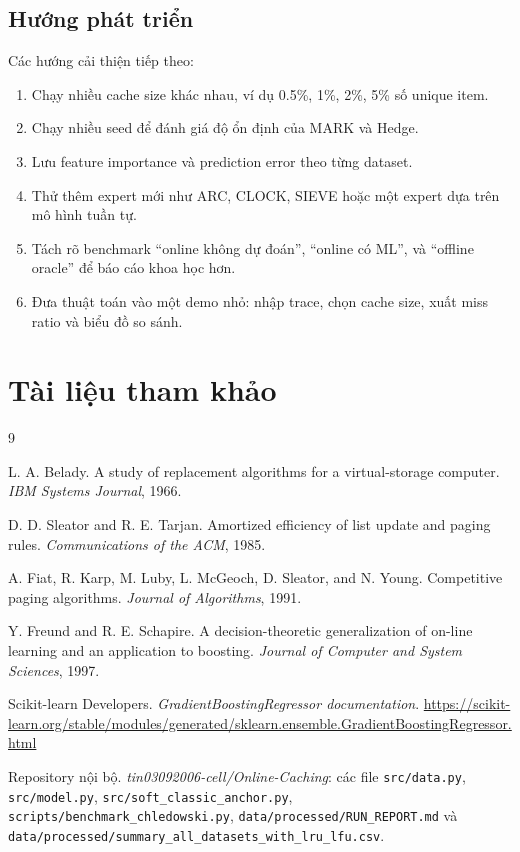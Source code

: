 \documentclass[11pt,a4paper]{article}
\newcommand{\code}[1]{\texttt{#1}}
\begin{document}
\subsection{Hướng phát triển}

Các hướng cải thiện tiếp theo:

\begin{enumerate}[leftmargin=1.4em]
    \item Chạy nhiều cache size khác nhau, ví dụ 0.5\%, 1\%, 2\%, 5\% số unique item.
    \item Chạy nhiều seed để đánh giá độ ổn định của MARK và Hedge.
    \item Lưu feature importance và prediction error theo từng dataset.
    \item Thử thêm expert mới như ARC, CLOCK, SIEVE hoặc một expert dựa trên mô hình tuần tự.
    \item Tách rõ benchmark ``online không dự đoán'', ``online có ML'', và ``offline oracle'' để báo cáo khoa học hơn.
    \item Đưa thuật toán vào một demo nhỏ: nhập trace, chọn cache size, xuất miss ratio và biểu đồ so sánh.
\end{enumerate}

\section{Tài liệu tham khảo}

\begin{thebibliography}{9}

L. A. Belady.
\newblock A study of replacement algorithms for a virtual-storage computer.
\newblock \emph{IBM Systems Journal}, 1966.

D. D. Sleator and R. E. Tarjan.
\newblock Amortized efficiency of list update and paging rules.
\newblock \emph{Communications of the ACM}, 1985.

A. Fiat, R. Karp, M. Luby, L. McGeoch, D. Sleator, and N. Young.
\newblock Competitive paging algorithms.
\newblock \emph{Journal of Algorithms}, 1991.

Y. Freund and R. E. Schapire.
\newblock A decision-theoretic generalization of on-line learning and an application to boosting.
\newblock \emph{Journal of Computer and System Sciences}, 1997.

Scikit-learn Developers.
\newblock \emph{GradientBoostingRegressor documentation}.
\newblock \url{https://scikit-learn.org/stable/modules/generated/sklearn.ensemble.GradientBoostingRegressor.html}

Repository nội bộ.
\newblock \emph{tin03092006-cell/Online-Caching}: các file \code{src/data.py}, \code{src/model.py}, \code{src/soft\_classic\_anchor.py}, \code{scripts/benchmark\_chledowski.py}, \code{data/processed/RUN\_REPORT.md} và \code{data/processed/summary\_all\_datasets\_with\_lru\_lfu.csv}.

\end{thebibliography}
\end{document}
